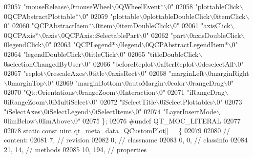 \begin{DoxyCode}
02057     \textcolor{stringliteral}{"mouseRelease\(\backslash\)0mouseWheel\(\backslash\)0QWheelEvent*\(\backslash\)0"}
02058     \textcolor{stringliteral}{"plottableClick\(\backslash\)0QCPAbstractPlottable*\(\backslash\)0"}
02059     \textcolor{stringliteral}{"plottable\(\backslash\)0plottableDoubleClick\(\backslash\)0itemClick\(\backslash\)0"}
02060     \textcolor{stringliteral}{"QCPAbstractItem*\(\backslash\)0item\(\backslash\)0itemDoubleClick\(\backslash\)0"}
02061     \textcolor{stringliteral}{"axisClick\(\backslash\)0QCPAxis*\(\backslash\)0axis\(\backslash\)0QCPAxis::SelectablePart\(\backslash\)0"}
02062     \textcolor{stringliteral}{"part\(\backslash\)0axisDoubleClick\(\backslash\)0legendClick\(\backslash\)0"}
02063     \textcolor{stringliteral}{"QCPLegend*\(\backslash\)0legend\(\backslash\)0QCPAbstractLegendItem*\(\backslash\)0"}
02064     \textcolor{stringliteral}{"legendDoubleClick\(\backslash\)0titleClick\(\backslash\)0"}
02065     \textcolor{stringliteral}{"titleDoubleClick\(\backslash\)0selectionChangedByUser\(\backslash\)0"}
02066     \textcolor{stringliteral}{"beforeReplot\(\backslash\)0afterReplot\(\backslash\)0deselectAll\(\backslash\)0"}
02067     \textcolor{stringliteral}{"replot\(\backslash\)0rescaleAxes\(\backslash\)0title\(\backslash\)0axisRect\(\backslash\)0"}
02068     \textcolor{stringliteral}{"marginLeft\(\backslash\)0marginRight\(\backslash\)0marginTop\(\backslash\)0"}
02069     \textcolor{stringliteral}{"marginBottom\(\backslash\)0autoMargin\(\backslash\)0color\(\backslash\)0rangeDrag\(\backslash\)0"}
02070     \textcolor{stringliteral}{"Qt::Orientations\(\backslash\)0rangeZoom\(\backslash\)0Interaction\(\backslash\)0"}
02071     \textcolor{stringliteral}{"iRangeDrag\(\backslash\)0iRangeZoom\(\backslash\)0iMultiSelect\(\backslash\)0"}
02072     \textcolor{stringliteral}{"iSelectTitle\(\backslash\)0iSelectPlottables\(\backslash\)0"}
02073     \textcolor{stringliteral}{"iSelectAxes\(\backslash\)0iSelectLegend\(\backslash\)0iSelectItems\(\backslash\)0"}
02074     \textcolor{stringliteral}{"LayerInsertMode\(\backslash\)0limBelow\(\backslash\)0limAbove\(\backslash\)0"}
02075 \};
02076 \textcolor{preprocessor}{#undef QT\_MOC\_LITERAL}
02077 
02078 \textcolor{keyword}{static} \textcolor{keyword}{const} uint qt\_meta\_data\_QCustomPlot[] = \{
02079 
02080  \textcolor{comment}{// content:}
02081        7,       \textcolor{comment}{// revision}
02082        0,       \textcolor{comment}{// classname}
02083        0,    0, \textcolor{comment}{// classinfo}
02084       21,   14, \textcolor{comment}{// methods}
02085       10,  194, \textcolor{comment}{// properties}

\end{DoxyCode}
